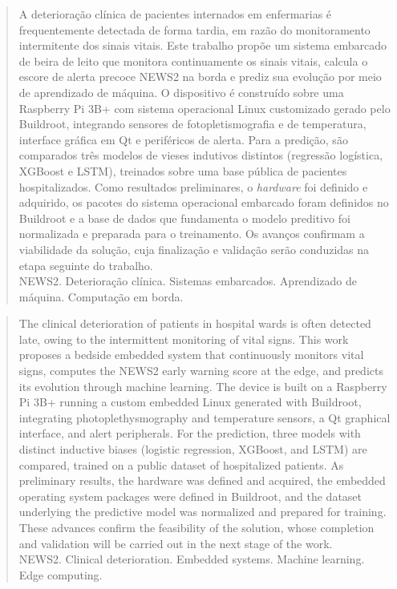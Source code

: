 \begin{abstract}
\noindent
A deterioração clínica de pacientes internados em enfermarias é frequentemente detectada de forma tardia, em razão do monitoramento intermitente dos sinais vitais. Este trabalho propõe um sistema embarcado de beira de leito que monitora continuamente os sinais vitais, calcula o escore de alerta precoce NEWS2 na borda e prediz sua evolução por meio de aprendizado de máquina. O dispositivo é construído sobre uma Raspberry Pi 3B+ com sistema operacional Linux customizado gerado pelo Buildroot, integrando sensores de fotopletismografia e de temperatura, interface gráfica em Qt e periféricos de alerta. Para a predição, são comparados três modelos de vieses indutivos distintos (regressão logística, XGBoost e LSTM), treinados sobre uma base pública de pacientes hospitalizados. Como resultados preliminares, o \textit{hardware} foi definido e adquirido, os pacotes do sistema operacional embarcado foram definidos no Buildroot e a base de dados que fundamenta o modelo preditivo foi normalizada e preparada para o treinamento. Os avanços confirmam a viabilidade da solução, cuja finalização e validação serão conduzidas na etapa seguinte do trabalho.
\\\textbf{} NEWS2. Deterioração clínica. Sistemas embarcados. Aprendizado de máquina. Computação em borda.
\end{abstract}

\newpage
{}
\begin{abstract}
\noindent
The clinical deterioration of patients in hospital wards is often detected late, owing to the intermittent monitoring of vital signs. This work proposes a bedside embedded system that continuously monitors vital signs, computes the NEWS2 early warning score at the edge, and predicts its evolution through machine learning. The device is built on a Raspberry Pi 3B+ running a custom embedded Linux generated with Buildroot, integrating photoplethysmography and temperature sensors, a Qt graphical interface, and alert peripherals. For the prediction, three models with distinct inductive biases (logistic regression, XGBoost, and LSTM) are compared, trained on a public dataset of hospitalized patients. As preliminary results, the hardware was defined and acquired, the embedded operating system packages were defined in Buildroot, and the dataset underlying the predictive model was normalized and prepared for training. These advances confirm the feasibility of the solution, whose completion and validation will be carried out in the next stage of the work.
\\\textbf{} NEWS2. Clinical deterioration. Embedded systems. Machine learning. Edge computing.
\end{abstract}
